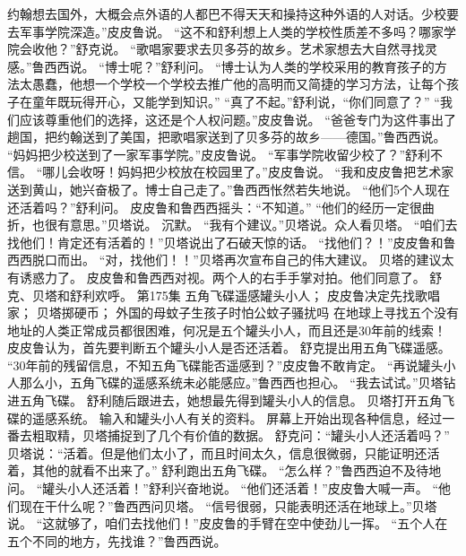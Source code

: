 \documentclass[a4paper,12pt,UTF8,twoside]{ctexbook}
\begin{document}
        约翰想去国外，大概会点外语的人都巴不得天天和操持这种外语的人对话。少校要去军事学院深造。”皮皮鲁说。 
        “这不和舒利想上人类的学校性质差不多吗？哪家学院会收他？”舒克说。 
        “歌唱家要求去贝多芬的故乡。艺术家想去大自然寻找灵感。”鲁西西说。 
        “博士呢？”舒利问。 
        “博士认为人类的学校采用的教育孩子的方法太愚蠢，他想一个学校一个学校去推广他的高明而又简捷的学习方法，让每个孩子在童年既玩得开心，又能学到知识。” 
        “真了不起。”舒利说，“你们同意了？” 
        “我们应该尊重他们的选择，这还是个人权问题。”皮皮鲁说。 
        “爸爸专门为这件事出了趟国，把约翰送到了美国，把歌唱家送到了贝多芬的故乡——德国。”鲁西西说。 
        “妈妈把少校送到了一家军事学院。”皮皮鲁说。 
        “军事学院收留少校了？”舒利不信。 
        “哪儿会收呀！妈妈把少校放在校园里了。”皮皮鲁说。 
        “我和皮皮鲁把艺术家送到黄山，她兴奋极了。博士自己走了。”鲁西西怅然若失地说。 
        “他们5个人现在还活着吗？”舒利问。 
        皮皮鲁和鲁西西摇头：“不知道。” 
        “他们的经历一定很曲折，也很有意思。”贝塔说。 
        沉默。 
        “我有个建议。”贝塔说。众人看贝塔。 
        “咱们去找他们！肯定还有活着的！”贝塔说出了石破天惊的话。 
        “找他们？！”皮皮鲁和鲁西西脱口而出。 
        “对，找他们！！”贝塔再次宣布自己的伟大建议。 
        贝塔的建议太有诱惑力了。 
        皮皮鲁和鲁西西对视。两个人的右手手掌对拍。他们同意了。 
        舒克、贝塔和舒利欢呼。   第175集 
        五角飞碟遥感罐头小人； 
        皮皮鲁决定先找歌唱家； 
        贝塔掷硬币； 
        外国的母蚊子生孩子时怕公蚊子骚扰吗   
        在地球上寻找五个没有地址的人类正常成员都很困难，何况是五个罐头小人，而且还是30年前的线索！ 
        皮皮鲁认为，首先要判断五个罐头小人是否还活着。 
        舒克提出用五角飞碟遥感。 
        “30年前的残留信息，不知五角飞碟能否遥感到？”皮皮鲁不敢肯定。 
        “再说罐头小人那么小，五角飞碟的遥感系统未必能感应。”鲁西西也担心。 
        “我去试试。”贝塔钻进五角飞碟。 
        舒利随后跟进去，她想最先得到罐头小人的信息。 
        贝塔打开五角飞碟的遥感系统。 
        输入和罐头小人有关的资料。 
        屏幕上开始出现各种信息，经过一番去粗取精，贝塔捕捉到了几个有价值的数据。 
        舒克问：“罐头小人还活着吗？” 
        贝塔说：“活着。但是他们太小了，而且时间太久，信息很微弱，只能证明还活着，其他的就看不出来了。” 
        舒利跑出五角飞碟。 
        “怎么样？”鲁西西迫不及待地问。 
        “罐头小人还活着！”舒利兴奋地说。 
        “他们还活着！”皮皮鲁大喊一声。 
        “他们现在干什么呢？”鲁西西问贝塔。 
        “信号很弱，只能表明还活在地球上。”贝塔说。 
        “这就够了，咱们去找他们！”皮皮鲁的手臂在空中使劲儿一挥。 
        “五个人在五个不同的地方，先找谁？”鲁西西说。 
\end{document}

